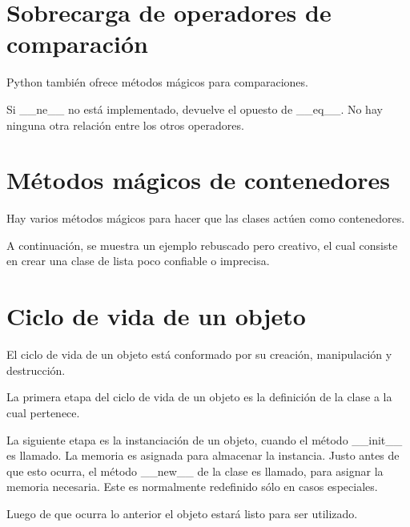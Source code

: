 \documentclass{report}
\begin{document}

\section{Sobrecarga de operadores de comparación}

Python también ofrece métodos mágicos para comparaciones.


Si \_\_ne\_\_ no está implementado, devuelve el opuesto de \_\_eq\_\_. No hay ninguna otra relación entre los otros operadores.


\section{Métodos mágicos de contenedores}

Hay varios métodos mágicos para hacer que las clases actúen como contenedores.


A continuación, se muestra un ejemplo rebuscado pero creativo, el cual consiste en crear una clase de lista poco confiable o imprecisa.



\section{Ciclo de vida de un objeto}

El ciclo de vida de un objeto está conformado por su creación, manipulación y destrucción.\smallskip

La primera etapa del ciclo de vida de un objeto es la definición de la clase a la cual pertenece.\smallskip

La siguiente etapa es la instanciación de un objeto, cuando el método \_\_init\_\_ es llamado. La memoria es asignada para almacenar la instancia. Justo antes de que esto ocurra, el método \_\_new\_\_ de la clase es llamado, para asignar la memoria necesaria. Este es normalmente redefinido sólo en casos especiales.\smallskip

Luego de que ocurra lo anterior el objeto estará listo para ser utilizado.\smallskip
\end{document}

